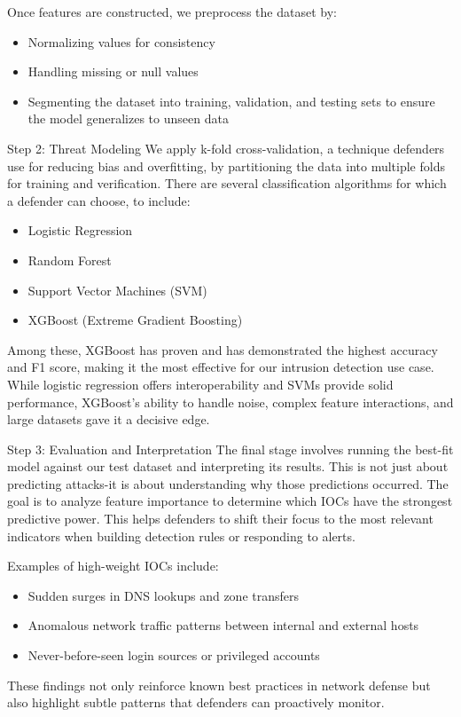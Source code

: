 Once features are constructed, we preprocess the dataset by:
\begin{itemize}
    \item Normalizing values for consistency
    \item Handling missing or null values
    \item Segmenting the dataset into training, validation, and testing sets to ensure the model generalizes to unseen data
\end{itemize}
Step 2: Threat Modeling
We apply k-fold cross-validation, a technique defenders use for reducing bias and overfitting, by partitioning the data into multiple folds for training and verification. There are several classification algorithms for which a defender can choose, to include:
\begin{itemize}
    \item Logistic Regression
    \item Random Forest
    \item Support Vector Machines (SVM)
    \item XGBoost (Extreme Gradient Boosting)    
\end{itemize}
Among these, XGBoost has proven and has demonstrated the highest accuracy and F1 score, making it the most effective for our intrusion detection use case. While logistic regression offers interoperability and SVMs provide solid performance, XGBoost's ability to handle noise, complex feature interactions, and large datasets gave it a decisive edge.

Step 3: Evaluation and Interpretation
The final stage involves running the best-fit model against our test dataset and interpreting its results. This is not just about predicting attacks-it is about understanding why those predictions occurred. The goal is to analyze feature importance to determine which IOCs have the strongest predictive power. This helps defenders to shift their focus to the most relevant indicators when building detection rules or responding to alerts.

Examples of high-weight IOCs include:
\begin{itemize}
    \item Sudden surges in DNS lookups and zone transfers
    \item Anomalous network traffic patterns between internal and external hosts
    \item Never-before-seen login sources or privileged accounts
\end{itemize}
These findings not only reinforce known best practices in network defense but also highlight subtle patterns that defenders can proactively monitor.
